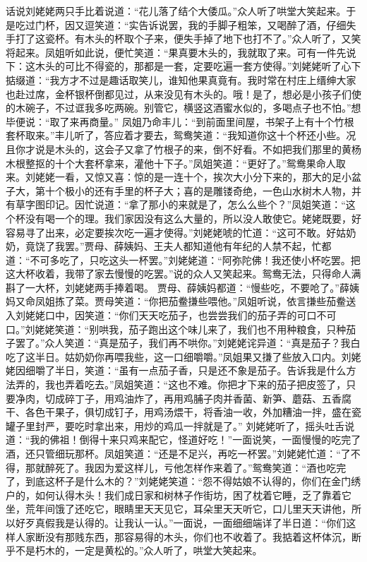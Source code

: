 \documentclass[12pt,oneside]{book}
\begin{document}
话说刘姥姥两只手比着说道：“花儿落了结个大倭瓜。”众人听了哄堂大笑起来。于是吃过门杯，因又逗笑道：“实告诉说罢，我的手脚子粗笨，又喝醉了酒，仔细失手打了这瓷杯。有木头的杯取个子来，便失手掉了地下也打不了。”众人听了，又笑将起来。凤姐听如此说，便忙笑道：“果真要木头的，我就取了来。可有一件先说下：这木头的可比不得瓷的，那都是一套，定要吃遍一套方使得。”刘姥姥听了心下掂缀道：“我方才不过是趣话取笑儿，谁知他果真竟有。我时常在村庄上缙绅大家也赴过席，金杯银杯倒都见过，从来没见有木头的。哦！是了，想必是小孩子们使的木碗子，不过诓我多吃两碗。别管它，横竖这酒蜜水似的，多喝点子也不怕。”想毕便说：“取了来再商量。”
凤姐乃命丰儿：“到前面里间屋，书架子上有十个竹根套杯取来。”丰儿听了，答应着才要去，鸳鸯笑道：“我知道你这十个杯还小些。况且你才说是木头的，这会子又拿了竹根子的来，倒不好看。不如把我们那里的黄杨木根整抠的十个大套杯拿来，灌他十下子。”凤姐笑道：“更好了。”鸳鸯果命人取来。刘姥姥一看，又惊又喜：惊的是一连十个，挨次大小分下来的，那大的足小盆子大，第十个极小的还有手里的杯子大；喜的是雕镂奇绝，一色山水树木人物，并有草字图印记。因忙说道：“拿了那小的来就是了，怎么么些个？”凤姐笑道：“这个杯没有喝一个的理。我们家因没有这么大量的，所以没人敢使它。姥姥既要，好容易寻了出来，必定要挨次吃一遍才使得。”刘姥姥唬的忙道：“这可不敢。好姑奶奶，竟饶了我罢。”贾母、薛姨妈、王夫人都知道他有年纪的人禁不起，忙都道：“不可多吃了，只吃这头一杯罢。”刘姥姥道：“阿弥陀佛！我还使小杯吃罢。把这大杯收着，我带了家去慢慢的吃罢。”说的众人又笑起来。鸳鸯无法，只得命人满斟了一大杯，刘姥姥两手捧着喝。
贾母、薛姨妈都道：“慢些吃，不要呛了。”薛姨妈又命凤姐拣了菜。贾母笑道：“你把茄鲞搛些喂他。”凤姐听说，依言搛些茄鲞送入刘姥姥口中，因笑道：“你们天天吃茄子，也尝尝我们的茄子弄的可口不可口。”刘姥姥笑道：“别哄我，茄子跑出这个味儿来了，我们也不用种粮食，只种茄子罢了。”众人笑道：“真是茄子，我们再不哄你。”刘姥姥诧异道：“真是茄子？我白吃了这半日。姑奶奶你再喂我些，这一口细嚼嚼。”凤姐果又搛了些放入口内。刘姥姥因细嚼了半日，笑道：“虽有一点茄子香，只是还不象是茄子。告诉我是什么方法弄的，我也弄着吃去。”凤姐笑道：“这也不难。你把才下来的茄子把皮签了，只要净肉，切成碎丁子，用鸡油炸了，再用鸡脯子肉并香菌、新笋、蘑菇、五香腐干、各色干果子，俱切成钉子，用鸡汤煨干，将香油一收，外加糟油一拌，盛在瓷罐子里封严，要吃时拿出来，用炒的鸡瓜一拌就是了。”
刘姥姥听了，摇头吐舌说道：“我的佛祖！倒得十来只鸡来配它，怪道好吃！”一面说笑，一面慢慢的吃完了酒，还只管细玩那杯。凤姐笑道：“还是不足兴，再吃一杯罢。”刘姥姥忙道：“了不得，那就醉死了。我因为爱这样儿，亏他怎样作来着了。”鸳鸯笑道：“酒也吃完了，到底这杯子是什么木的？”刘姥姥笑道：“怨不得姑娘不认得的，你们在金门绣户的，如何认得木头！我们成日家和树林子作街坊，困了枕着它睡，乏了靠着它坐，荒年间饿了还吃它，眼睛里天天见它，耳朵里天天听它，口儿里天天讲他，所以好歹真假我是认得的。让我认一认。”一面说，一面细细端详了半日道：“你们这样人家断没有那贱东西，那容易得的木头，你们也不收着了。我掂着这杯体沉，断乎不是朽木的，一定是黄松的。”众人听了，哄堂大笑起来。
\end{document}
